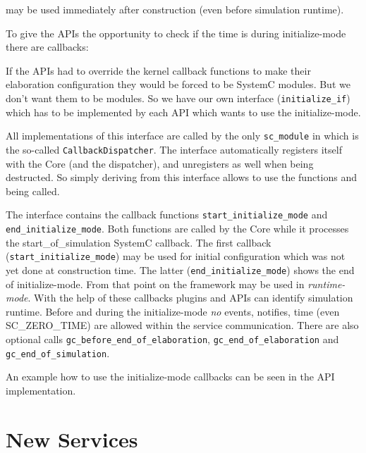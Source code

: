 \GreenControl may be used immediately after construction (even before simulation runtime).%

To give the APIs the opportunity to check if the time is during initialize-mode there are callbacks:

If the APIs had to override the kernel callback functions to make their elaboration configuration
they would be forced to be SystemC modules. But we don't want them to be modules. So we have our own
interface (\lstinline|initialize_if|) which has to be implemented by each API which wants to use the
initialize-mode. %

All implementations of this interface are called by the only \lstinline|sc_module| in \GreenControl which is the so-called \lstinline|CallbackDispatcher|. The interface automatically registers itself with the Core (and the dispatcher), and unregisters as well when being destructed.
So simply deriving from this interface allows to use the functions and being called.

The interface contains the callback functions
\lstinline|start_initialize_mode| and \mbox{\lstinline|end_initialize_mode|.} Both functions are called by the Core while it processes the start\_of\_simulation SystemC callback. The first callback (\lstinline|start_initialize_mode|) may be used for initial configuration which was not yet done at construction time. The latter (\lstinline|end_initialize_mode|) shows the end of initialize-mode. From that point on the framework may be used in {\em runtime-mode}. With the help of these callbacks plugins and APIs can identify simulation runtime. Before and during the initialize-mode {\em no} events, notifies, time (even SC\_ZERO\_TIME) are allowed within the service communication. There are also optional calls \lstinline|gc_before_end_of_elaboration|,  \lstinline|gc_end_of_elaboration| and \lstinline|gc_end_of_simulation|.

An example how to use the initialize-mode callbacks can be seen in the \GreenConfig API implementation.



\section{New Services}
\label{GCNewServices}

